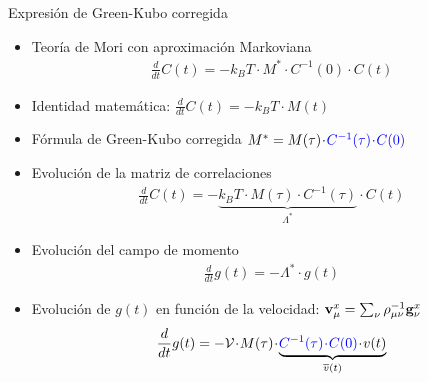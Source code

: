 \documentclass{beamer}
\newcommand{\esc}{\!\cdot\!}
\begin{document}
\begin{frame}{Expresión de Green-Kubo corregida}
  \begin{itemize}
    \item<1-> Teoría de Mori con aproximación Markoviana
      \begin{align}
        \frac{d}{dt}C(t)=-k_BT\esc M^*\esc C^{-1}(0)\esc C(t)
        \nonumber
      \end{align}
    \item<2-> Identidad matemática:  $\frac{d}{dt}C(t)=-k_B T\esc M(t)$
    \item<3-> Fórmula de Green-Kubo corregida  
      $ M^*=M(\tau)\esc {\color{blue}C^{-1}(\tau)\esc C(0)}$
    \item<4-> Evolución de la matriz de correlaciones
      \begin{align}
        \frac{d}{dt}C(t)=-\underbrace{k_BT\esc M(\tau)\esc  C^{-1}(\tau)}_{\Lambda^*}\esc C(t)
        \nonumber
      \end{align}
    \item<5-> Evolución del campo de momento
      \begin{align}
        \frac{d}{dt}g(t)=-\Lambda^*\esc g(t)
        \nonumber
      \end{align}
    \item<6-> Evolución de $g(t)$ en función de la velocidad: 
      ${\bf v}^x_\mu=\sum_{\nu}\rho_{\mu\nu}^{-1}{\bf g}^x_\nu$
      \begin{align}
        \frac{d}{dt}g(t)=-{\cal V}\esc M(\tau)\esc \underbrace{{\color{blue}C^{-1}(\tau)\esc C(0)}\esc v(t)}_{\overline{v}(t)}
        \nonumber
      \end{align}
  \end{itemize}
\end{frame}
\end{document}
